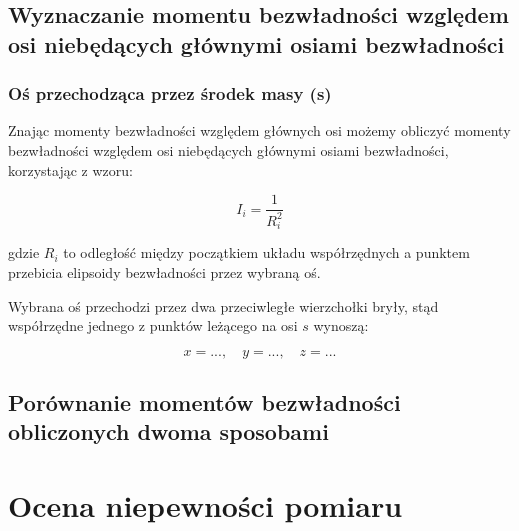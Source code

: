 \documentclass[a4paper,12pt]{article}
\begin{document}
\subsection{Wyznaczanie momentu bezwładności względem osi niebędących głównymi osiami bezwładności}


\subsubsection{Oś przechodząca przez środek masy (s)}

Znając momenty bezwładności względem głównych osi możemy obliczyć momenty bezwładności względem osi niebędących głównymi osiami bezwładności, korzystając z wzoru:

\begin{equation*}
    I_i = \frac{1}{R_i^2}
\end{equation*}

gdzie $R_i$ to odległość między początkiem układu współrzędnych a punktem przebicia elipsoidy bezwładności przez wybraną oś.

Wybrana oś przechodzi przez dwa przeciwległe wierzchołki bryły, stąd współrzędne jednego z punktów leżącego na osi $s$ wynoszą:

\begin{equation*}
    x = ..., \quad
    y = ..., \quad
    z = ...
\end{equation*}




\subsection{Porównanie momentów bezwładności obliczonych dwoma sposobami}



\section{Ocena niepewności pomiaru}
\end{document}
